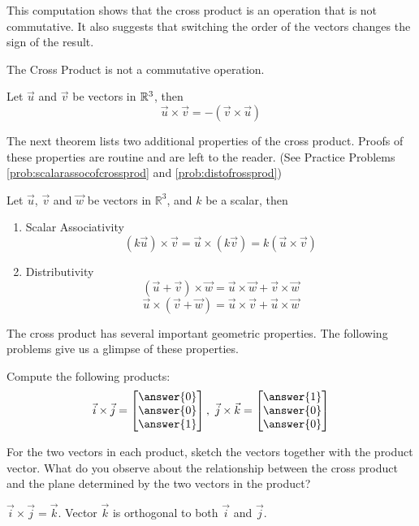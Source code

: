 \documentclass{ximera}
\begin{document}
\begin{exploration}
This computation shows that the cross product is an operation that is not commutative. It also suggests that switching the order of the vectors changes the sign of the result.
\end{exploration}
 
\begin{warning}The Cross Product is not a commutative operation.
\end{warning}
 
\begin{theorem}\label{th:corssuvnegcrossvu}
Let $\vec{u}$ and $\vec{v}$ be vectors in $\mathbb{R}^3$, then
$$\vec{u}\times\vec{v}=-(\vec{v}\times\vec{u})$$
\end{theorem}

The next theorem lists two additional properties of the cross product.  Proofs of these properties are routine and are left to the reader.  (See Practice Problems \ref{prob:scalarassocofcrossprod} and \ref{prob:distofrossprod})
\begin{theorem}\label{th:crossproductproperties}
Let $\vec{u}$, $\vec{v}$ and $\vec{w}$ be vectors in $\mathbb{R}^3$, and $k$ be a scalar, then\\
\begin{enumerate}
\item\label{item:scalarassocofcrossprod} Scalar Associativity
$$(k\vec{u})\times \vec{v}=\vec{u}\times (k\vec{v})=k(\vec{u}\times \vec{v})$$
\item\label{item:distofrossprod} Distributivity
$$(\vec{u}+\vec{v})\times \vec{w}=\vec{u}\times \vec{w}+\vec{v}\times \vec{w}$$
$$\vec{u}\times (\vec{v}+\vec{w})=\vec{u}\times \vec{v}+\vec{u}\times \vec{w}$$
\end{enumerate}
\end{theorem}
 
The cross product has several important geometric properties. The following problems give us a glimpse of these properties.
 
\begin{exploration}\label{init:ijkcrossproducts}
Compute the following products:
$$\vec{i}\times\vec{j}=\begin{bmatrix}\answer{0}\\\answer{0}\\\answer{1}\end{bmatrix},\quad\vec{j}\times\vec{k}=\begin{bmatrix}\answer{1}\\\answer{0}\\\answer{0}\end{bmatrix}$$
 
For the two vectors in each product, sketch the vectors together with the product vector.  What do you observe about the relationship between the cross product and the plane determined by the two vectors in the product? 
\begin{hint}
$\vec{i}\times\vec{j}=\vec{k}$.  Vector $\vec{k}$ is orthogonal to both $\vec{i}$ and $\vec{j}$. 
\end{hint}
 
 
 
\end{exploration}
 
\end{document}
